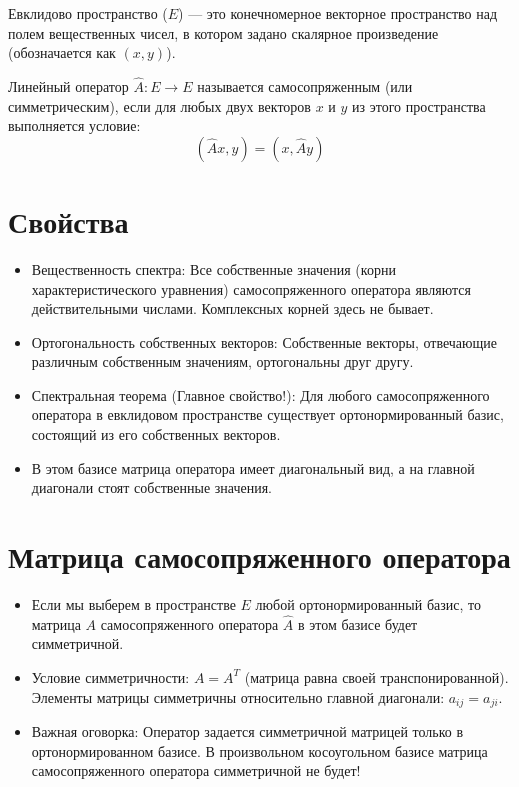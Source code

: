 \documentclass[14pt]{extreport}
\begin{document}
    \begin{defbox}
            Евклидово пространство ($E$) — это конечномерное векторное пространство над полем вещественных чисел, в котором задано скалярное произведение (обозначается как $(x, y)$).
    \end{defbox}

    \begin{defbox}
        Линейный оператор $\hat{A}: E \to E$ называется самосопряженным (или симметрическим), если для любых двух векторов $x$ и $y$ из этого пространства выполняется условие:$$(\hat{A}x, y) = (x, \hat{A}y)$$
    \end{defbox}

    \section{Свойства}
    \begin{itemize}
        \item Вещественность спектра: Все собственные значения (корни характеристического уравнения) самосопряженного оператора являются действительными числами. Комплексных корней здесь не бывает.
        \item Ортогональность собственных векторов: Собственные векторы, отвечающие различным собственным значениям, ортогональны друг другу.
        \item Спектральная теорема (Главное свойство!): Для любого самосопряженного оператора в евклидовом пространстве существует ортонормированный базис, состоящий из его собственных векторов.
        \item В этом базисе матрица оператора имеет диагональный вид, а на главной диагонали стоят собственные значения.
    \end{itemize}

    \section{Матрица самосопряженного оператора}

    \begin{itemize}
        \item Если мы выберем в пространстве $E$ любой ортонормированный базис, то матрица $A$ самосопряженного оператора $\hat{A}$ в этом базисе будет симметричной.
        \item Условие симметричности: $A = A^T$ (матрица равна своей транспонированной). Элементы матрицы симметричны относительно главной диагонали: $a_{ij} = a_{ji}$.
        \item Важная оговорка: Оператор задается симметричной матрицей только в ортонормированном базисе. В произвольном косоугольном базисе матрица самосопряженного оператора симметричной не будет!
    \end{itemize}
\end{document}
